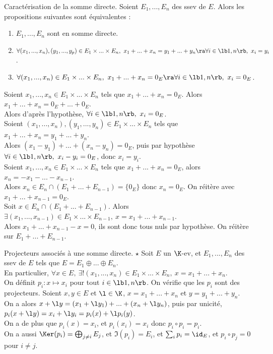 \documentclass[11pt]{article}
\begin{document}
\vspace*{-0.8cm}

\begin{prop}{Caractérisation de la somme directe.}{}
    Soient $E_1,...,E_n$ des ssev de $E$. Alors les propositions suivantes sont équivalentes :
    \begin{enumerate}
        \item $E_1,...,E_n$ sont en somme directe.
        \item $\forall (x_1,...,x_n),(y_1,...,y_p)\in E_1\times...\times E_n, ~ x_1+...+x_n=y_1+...+y_n \ra \forall i \in \lb1,n\rb, ~ x_i=y_i$.
        \item $\forall (x_1,...,x_n)\in E_1\times...\times E_n, ~ x_1+...+x_n=0_E \ra \forall i \in \lb1,n\rb, ~ x_i = 0_E$.
    \end{enumerate}
    \tcblower
     Soient $x_1,...,x_n\in E_1\times...\times E_n$ tels que $x_1+...+x_n=0_E$. Alors $x_1+...+x_n=0_E+...+0_E$.\\
    Alors d'après l'hypothèse, $\forall i \in \lb1,n\rb, ~ x_i=0_E$.\\
     Soient $(x_1,...,x_n),(y_1,...,y_n)\in E_1\times...\times E_n$ tels que $x_1+...+x_n=y_1+...+y_n$.\\
    Alors $(x_1-y_1)+...+(x_n-y_n)=0_E$, puis par hypothèse $\forall i \in \lb1,n\rb, ~ x_i-y_i=0_E$, donc $x_i=y_i$.\\
     Soient $x_1,...,x_n\in E_1\times...\times E_n$ tels que $x_1+...+x_n=0_E$, alors $x_n=-x_1-...-x_{n-1}$.\\
    Alors $x_n\in E_n \cap (E_1+...+E_{n-1})=\{0_E\}$ donc $x_n = 0_E$. On réitère avec $x_1+...+x_{n-1}=0_E$.\\
     Soit $x\in E_n\cap (E_1+...+E_{n-1})$. Alors $\exists (x_1,...,x_{n-1})\in E_1\times...\times E_{n-1}, ~ x = x_1+...+x_{n-1}$.\\
    Alors $x_1+...+x_{n-1}-x=0$, ils sont donc tous nuls par hypothèse. On réitère sur $E_1+...+E_{n-1}$.
\end{prop}

\vspace*{-0.8cm}

\begin{defi}{Projecteurs associés à une somme directe. $\star$}{}
    Soit $E$ un $\K$-ev, et $E_1,...,E_n$ des ssev de $E$ tels que $E=E_1\oplus...\oplus E_n$.\\
    En particulier, $\forall x \in E, ~ \exists!(x_1,...,x_n)\in E_1\times...\times E_n, ~ x=x_1+...+x_n$.\\
    On définit $p_i:x\mapsto x_i$ pour tout $i\in\lb1,n\rb$.
    \tcblower
    On vérifie que les $p_i$ sont des projecteurs. Soient $x,y\in E$ et $\l\in\K$, $x=x_1+...+x_n$ et $y=y_1+...+y_n$.\\
    On a alors $x+\l y = (x_1+\l y_1)+...+(x_n+\l y_n)$, puis par unicité, $p_i(x+\l y)=x_i+\l y_i = p_i(x)+\l p_i(y)$.\\
    On a de plus que $p_i(x)=x_i$, et $p_i(x_i)=x_i$ donc $p_i\circ p_i = p_i$.\\
    On a aussi $\Ker(p_i)=\bigoplus_{j\neq i}E_j$, et $\Im(p_i)=E_i$, et $\sum_ip_i=\id_E$, et $p_i\circ p_j = 0$ pour $i\neq j$.
\end{defi}
\end{document}
